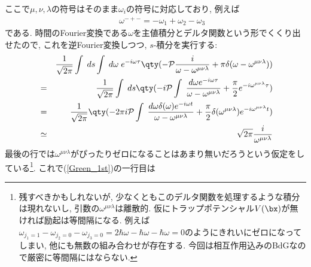 \documentclass[10.5pt,a4paper]{jreport}
\begin{document}
ここで$\mu, \nu, \lambda$の符号はそのまま$\omega_i$の符号に対応しており, 例えば
\begin{eqnarray}
  &&\omega^{-+-} = -\omega_1 + \omega_2 - \omega_3
\end{eqnarray}
である. 時間のFourier変換である$\omega$を主値積分とデルタ関数という形でくくり出せたので, これを逆Fourier変換しつつ, $s$-積分を実行する:
\begin{eqnarray}
  &&\frac{1}{\sqrt{2\pi}} \int\;ds\int\;d\omega\; e^{-i\omega\tau}\qty(-{\cal P}\frac{i}{\omega - \omega^{\mu\nu\lambda}} + \pi\delta(\omega - \omega^{\mu\nu\lambda}))\\
  &=&\frac{1}{\sqrt{2\pi}}\int\;ds\qty(-i{\cal P}\int\;\frac{d\omega e^{-i\omega\tau}}{\omega - \omega^{\mu\nu\lambda}} + \frac{\pi}{2}e^{-i\omega^{\mu\nu\lambda}\tau})\\
  &=& \frac{1}{\sqrt{2\pi}}\qty(-2\pi i{\cal P}\int\;\frac{d\omega \delta(\omega)e^{-i\omega t}}{\omega - \omega^{\mu\nu\lambda}} + \frac{\pi}{2}\delta(\omega^{\mu\nu\lambda})e^{-i\omega^{\mu\nu\lambda}t})\\
  &\simeq&\sqrt{2\pi}\frac{i}{\omega^{\mu\nu\lambda}}
\end{eqnarray}
最後の行では$\omega^{\mu\nu\lambda}$がぴったりゼロになることはあまり無いだろうという仮定をしている\footnote{残すべきかもしれないが, 少なくともこのデルタ関数を処理するような積分は現れないし, 引数の$\omega^{\mu\nu\lambda}$は離散的. 仮にトラップポテンシャル$V(\bx)$が無ければ励起は等間隔になる. 例えば$\omega_{j_1 = 1} - \omega_{j_2 = 0} - \omega_{j_3 = 0} = 2\hbar\omega -\hbar\omega - \hbar\omega = 0$のようにきれいにゼロになってしまい, 他にも無数の組み合わせが存在する. 今回は相互作用込みのBdGなので厳密に等間隔にはならない.}. これで(\ref{Green_1st})の一行目は
\end{document}
